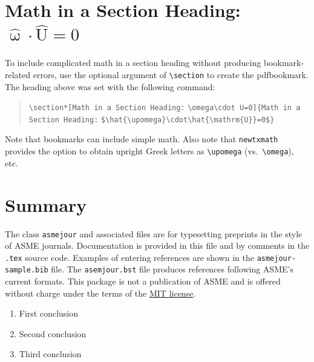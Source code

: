 \documentclass[largesc,upint,varvw,barcolor=Red4,nocopyright,hyphenate,balance,lang-second=french,lang=english]{asmejour}
\begin{document}
\section[Math in a Section Heading: \omega\cdot U=0]{Math in a Section Heading: $\hat{\upomega}\cdot\hat{\mathrm{U}}=0$}

To include complicated math in a section heading without producing bookmark-related errors, use the optional argument of \verb|\section| to create the pdfbookmark. The heading above was set with the following command:
\begin{quote}\raggedright
\verb|\section*[Math in a Section Heading:| 
\hspace*{1em}\verb|\omega\cdot U=0]{Math in a Section Heading:|
\hspace*{1em}\verb|$\hat{\upomega}\cdot\hat{\mathrm{U}}=0$}|
\end{quote}
Note that bookmarks can include simple math. Also note that \texttt{newtxmath} provides the option to obtain upright Greek letters as \verb|\upomega| (vs.\ \verb|\omega|), etc.


\section{Summary}
The class \texttt{asmejour} and associated files are for typesetting preprints in the style of ASME journals.
Documentation is provided in this file and by comments in the \texttt{.tex} source code. Examples of entering references are shown in the \texttt{asmejour-sample.bib} file.  The \texttt{asemjour.bst} file produces references following ASME's current formats.  This package is not a publication of ASME and is offered without charge under the terms of the \href{https://ctan.org/license/mit}{MIT license}. 

\begin{enumerate}
\item First conclusion 
\item Second conclusion
\item Third conclusion
\end{enumerate}
\end{document}
